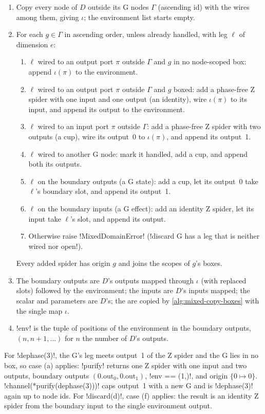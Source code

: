 \begin{algorithm}[Purification]\label{alg:mixed-purify}
\begin{enumerate}
\item Copy every node of $D$ outside its G nodes $\Gamma$ (ascending id) with the wires among them, giving $\iota$; the environment list starts empty.
\item For each $g\in\Gamma$ in ascending order, unless already handled, with leg $\ell$ of dimension $e$:
\begin{enumerate}
\item $\ell$ wired to an output port $\pi$ outside $\Gamma$ and $g$ in no node-scoped box: append $\iota(\pi)$ to the environment.
\item $\ell$ wired to an output port $\pi$ outside $\Gamma$ and $g$ boxed: add a phase-free Z spider with one input and one output (an identity), wire $\iota(\pi)$ to its input, and append its output to the environment.
\item $\ell$ wired to an input port $\pi$ outside $\Gamma$: add a phase-free Z spider with two outputs (a cup), wire its output~0 to $\iota(\pi)$, and append its output~1.
\item $\ell$ wired to another G node: mark it handled, add a cup, and append both its outputs.
\item $\ell$ on the boundary outputs (a G state): add a cup, let its output~0 take $\ell$'s boundary slot, and append its output~1.
\item $\ell$ on the boundary inputs (a G effect): add an identity Z spider, let its input take $\ell$'s slot, and append its output.
\item Otherwise raise \py!MixedDomainError! (\code!discard G has a leg that is neither wired nor open!).
\end{enumerate}
Every added spider has origin $g$ and joins the scopes of $g$'s boxes.
\item The boundary outputs are $D$'s outputs mapped through $\iota$ (with replaced slots) followed by the environment; the inputs are $D$'s inputs mapped; the scalar and parameters are $D$'s; the \bboxes{} are copied by \cref{alg:mixed-copy-boxes} with the single map $\iota$.
\item \py!env! is the tuple of positions of the environment in the boundary outputs, $(n, n+1, \dots)$ for $n$ the number of $D$'s outputs.
\end{enumerate}
\end{algorithm}

\begin{example}
For \py!dephase(3)!, the G's leg meets output~1 of the Z spider and the G lies in no box, so case (a) applies: \py!purify! returns one Z spider with one input and two outputs, boundary outputs $(0.\mathrm{out}_0, 0.\mathrm{out}_1)$, \py!env == (1,)!, and origin $\{0\mapsto 0\}$. \py!channel(*purify(dephase(3)))! caps output~1 with a new G and is \py!dephase(3)! again up to node ids. For \py!discard(d)!, case (f) applies: the result is an identity Z spider from the boundary input to the single environment output.
\end{example}

